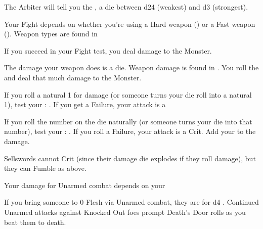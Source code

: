 {  

  The Arbiter will tell you the , a \STATIC die between d24 (weakest) and d3 (strongest).

  Your Fight \RO depends on whether you're using a Hard weapon (\VIG) or a Fast weapon (\DEX).  Weapon types are found in 

  If you succeed in your Fight \RO test, you deal damage to the Monster.


  The damage your weapon does is a \STATIC die.  Weapon damage is found in .  You roll the \STATIC and deal that much damage to the Monster.

  If you roll a natural 1 for damage (or someone turns your die roll into a natural 1), test your  \RS : \DEX.  If you get a Failure, your attack is a 

  If you roll the \MAX number on the die naturally (or someone turns your die into that \MAX number), test your \RS : \VIG.  If you  roll a Failure, your attack is a Crit.  Add your \LVL to the damage.


  Sellswords cannot Crit (since their damage die explodes if they roll \MAX damage), but they can Fumble as above.




  Your damage for Unarmed combat depends on your \VIG


  If you bring someone to 0 Flesh via Unarmed combat, they are  for d4 .  Continued Unarmed attacks against Knocked Out foes prompt Death's Door rolls as you beat them to death.

}
